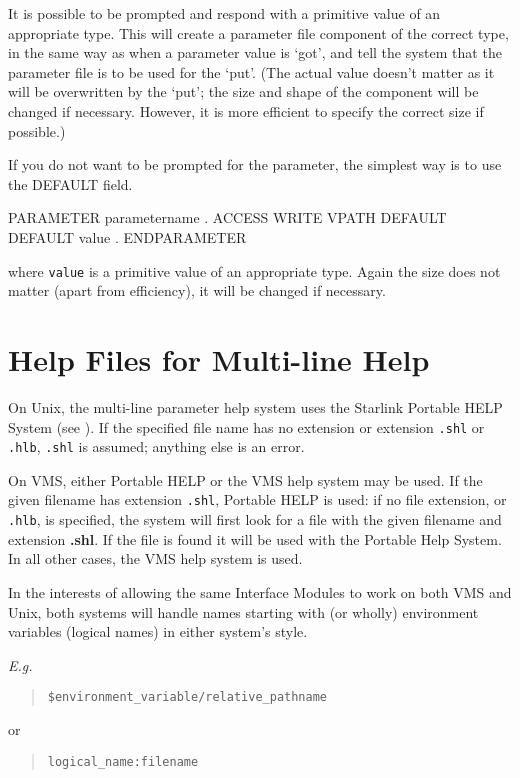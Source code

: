 \documentclass[twoside,11pt,nolof]{starlink}
\begin{document}
It is possible to be prompted and respond with a primitive value
of an appropriate type.
This will create a parameter file component of the correct type, in
the same way as when a parameter value is `got', and tell the system that
the parameter file is to be used for the `put'.
(The actual value doesn't matter as it will be overwritten by the `put';
the size and shape of the component will be changed if necessary. However,
it is more efficient to specify the correct size if possible.)

If you do not want to be prompted for the parameter, the simplest way is
to use the DEFAULT field.
\begin{terminalv}
PARAMETER parametername
      .
   ACCESS WRITE
   VPATH DEFAULT
   DEFAULT value
      .
ENDPARAMETER
\end{terminalv}
where \texttt{value} is a primitive value of an appropriate type. Again the
size does not matter (apart from efficiency), it will be changed if
necessary.

\newpage
\section{Help Files for Multi-line Help
\label{help}}

On Unix, the multi-line parameter help system uses the Starlink Portable HELP
System (see ).
If the specified file name has no extension or extension
\texttt{.shl} or \texttt{.hlb}, \texttt{.shl} is assumed; anything else is an error.

On VMS, either Portable HELP or the VMS help system
may be used.
If the given filename has extension \texttt{.shl}, Portable HELP is used:
if no file extension, or \texttt{.hlb}, is specified,
the system will first look for a file with the given filename and extension
\textbf{.shl}.
If the file is found it will be used with the Portable Help System.
In all other cases, the VMS help system is used.

In the interests of allowing the same Interface Modules to work on both VMS
and Unix, both systems will handle names starting with (or wholly) environment
variables (logical names) in either system's style.

\emph{E.g.}
\begin{quote}
\texttt{\$environment\_variable/relative\_pathname}\/
\end{quote}
or
\begin{quote}
\texttt{logical\_name:filename}
\end{quote}
\end{document}
